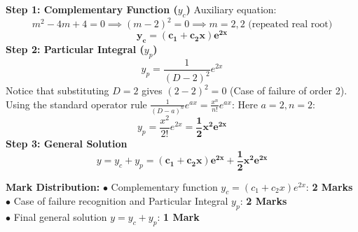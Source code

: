 \begin{solutionbox}
\textbf{Step 1: Complementary Function ($y_c$)}
Auxiliary equation:
\[
m^2 - 4m + 4 = 0 \implies (m - 2)^2 = 0 \implies m = 2, 2 \text{ (repeated real root)}
\]
\[
\mathbf{y_c = (c_1 + c_2 x) e^{2x}}
\]
\textbf{Step 2: Particular Integral ($y_p$)}
\[
y_p = \frac{1}{(D - 2)^2} e^{2x}
\]
Notice that substituting $D = 2$ gives $(2-2)^2 = 0$ (Case of failure of order 2).
Using the standard operator rule $\frac{1}{(D - a)^n} e^{ax} = \frac{x^n}{n!} e^{ax}$:
Here $a = 2, n = 2$:
\[
y_p = \frac{x^2}{2!} e^{2x} = \mathbf{\frac{1}{2} x^2 e^{2x}}
\]
\textbf{Step 3: General Solution}
\[
y = y_c + y_p = \mathbf{(c_1 + c_2 x) e^{2x} + \frac{1}{2} x^2 e^{2x}}
\]

\begin{markingrubric}
\textbf{Mark Distribution:}
$\bullet$ Complementary function $y_c = (c_1 + c_2 x)e^{2x}$: \textbf{2 Marks}\\
$\bullet$ Case of failure recognition and Particular Integral $y_p$: \textbf{2 Marks}\\
$\bullet$ Final general solution $y = y_c + y_p$: \textbf{1 Mark}
\end{markingrubric}
\end{solutionbox}

\newpage
